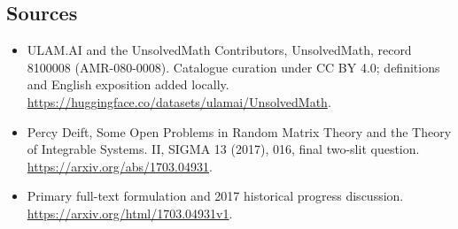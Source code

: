 \documentclass[11pt]{article}
\begin{document}
\subsection{Sources}
\begin{itemize}
\item[\hypertarget{source:8100008:1}{S1}] ULAM.AI and the UnsolvedMath Contributors, UnsolvedMath, record 8100008 (AMR-080-0008). Catalogue curation under CC BY 4.0; definitions and English exposition added locally.
\url{https://huggingface.co/datasets/ulamai/UnsolvedMath}.
\item[\hypertarget{source:8100008:2}{S2}] Percy Deift, Some Open Problems in Random Matrix Theory and the Theory of Integrable Systems. II, SIGMA 13 (2017), 016, final two-slit question.
\url{https://arxiv.org/abs/1703.04931}.
\item[\hypertarget{source:8100008:3}{S3}] Primary full-text formulation and 2017 historical progress discussion.
\url{https://arxiv.org/html/1703.04931v1}.
\end{itemize}
\label{end:8100008}
\end{document}
